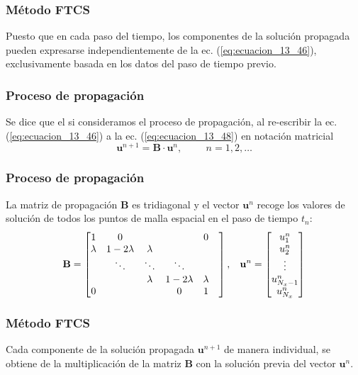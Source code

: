 \begin{frame}
\frametitle{Método FTCS}
Puesto que en cada paso del tiempo, los componentes de la solución propagada pueden expresarse independientemente de la ec. (\ref{eq:ecuacion_13_46}), exclusivamente basada en los datos del paso de tiempo previo.
\end{frame}
\begin{frame}
\frametitle{Proceso de propagación}
Se dice que el  si consideramos el proceso de propagación, al re-escribir la ec. (\ref{eq:ecuacion_13_46}) a la ec. (\ref{eq:ecuacion_13_48}) en notación matricial
\begin{equation}
\mathbf{u}^{n + 1} =  \mathbf{B} \cdot \mathbf{u}^{n}, \hspace{1cm} n = 1, 2, \ldots
\label{eq:ecuacion_13_49}
\end{equation}
\end{frame}
\begin{frame}
\frametitle{Proceso de propagación}
La matriz de propagación $\mathbf{B}$ es tridiagonal y el vector $\mathbf{u}^{n}$ recoge los valores de solución de todos los puntos de malla espacial en el paso de tiempo $t_{n}$:
\fontsize{12}{12}\selectfont
\begin{equation}
\mathbf{B} = \begin{bmatrix}
1 & 0 & & & 0 \\
\lambda & 1 - 2 \lambda & \lambda & & & \\
 & \ddots & \ddots & \ddots & \\
 & & \lambda & 1 - 2 \lambda & \lambda \\
 0 & & & 0 & 1
\end{bmatrix},
\hspace{0.3cm}
\mathbf{u}^{n} = 
\begin{bmatrix}
u_{1}^{n} \\
u_{2}^{n} \\
\vdots \\
u_{N_{x} - 1}^{n} \\
u_{N_{x}}^{n} 
\end{bmatrix}
\label{eq:ecuacion_13_50}
\end{equation}
\end{frame}
\begin{frame}
\frametitle{Método FTCS}
Cada componente de la solución propagada $\mathbf{u}^{n + 1}$ de manera individual, se obtiene de la multiplicación de la matriz $\mathbf{B}$ con la solución previa del vector $\mathbf{u}^{n}$.
\end{frame}
